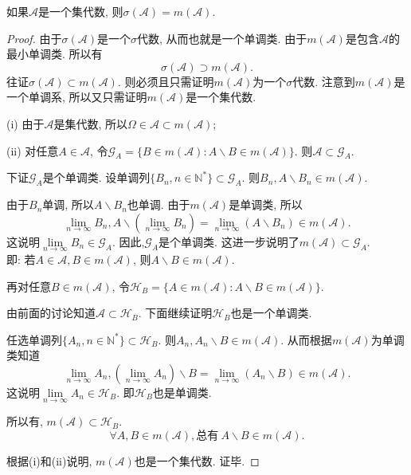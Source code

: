 \begin{theorem}
	如果$\mathscr{A}$是一个集代数, 则$\sigma(\mathscr{A})=m(\mathscr{A})$.
\end{theorem}
\begin{proof}
	由于$\sigma(\mathscr{A})$是一个$\sigma$代数,
	从而也就是一个单调类. 由于$m(\mathscr{A})$是包含$\mathscr{A}$的最小单调类. 所以有
	\begin{equation}
	\sigma(\mathscr{A})\supset m(\mathscr{A}).
	\end{equation}
	往证$\sigma(\mathscr{A})\subset m(\mathscr{A})$. 则必须且只需证明$m(\mathscr{A})$为一个$\sigma$代数. 注意到$m(\mathscr{A})$是一个单调系, 所以又只需证明$m(\mathscr{A})$是一个集代数.
	
	\begin{blist}
		\item[(i)] 由于$\mathscr{A}$是集代数, 所以$\Omega\in\mathscr{A}\subset m(\mathscr{A})$;
		\item[(ii)] 对任意$A\in\mathscr{A}$, 令$\mathscr{G}_{A} = \{ B\in m(\mathscr{A}): A\backslash B\in m(\mathscr{A}) \}$. 则$\mathscr{A}\subset \mathscr{G}_{A}$.
		
		下证$\mathscr{G}_{A}$是个单调类. 设单调列$\{B_n,n\in\mathbb{N}^*\}\subset \mathscr{G}_A$. 则$B_n,A\backslash B_n\in m(\mathscr{A})$.
		
		由于$B_n$单调, 所以$A\backslash B_n$也单调. 由于$m(\mathscr{A})$是单调类, 所以
		\begin{equation}
		\lim_{n\to\infty}B_n,A\backslash\left(\lim_{n\to\infty}B_n\right) = \lim_{n\to\infty}(A\backslash B_n) \in m(\mathscr{A}).
		\end{equation}
		这说明$\lim\limits_{n\to\infty}B_n\in\mathscr{G}_A$. 因此,$\mathscr{G}_{A}$是个单调类. 这进一步说明了$m(\mathscr{A})\subset \mathscr{G}_A$.\\
		即: 若$A\in\mathscr{A},B\in m(\mathscr{A})$, 则$A\backslash B\in m(\mathscr{A})$.
		
		再对任意$B\in m(\mathscr{A})$, 令$\mathscr{H}_{B} = \{ A\in m(\mathscr{A}):A\backslash B\in m(\mathscr{A}) \}$.
		
		由前面的讨论知道$\mathscr{A}\subset \mathscr{H}_B$. 下面继续证明$\mathscr{H}_B$也是一个单调类.
		
		任选单调列$\{A_n,n\in\mathbb{N}^*\}\subset \mathscr{H}_B$. 则$A_n,A_n\backslash B\in m(\mathscr{A})$. 从而根据$m(\mathscr{A})$为单调类知道
		\begin{equation}
		\lim_{n\to\infty}A_n,\left(\lim_{n\to\infty}A_n\right)\backslash B = \lim_{n\to\infty}(A_n\backslash B)\in m(\mathscr{A}).
		\end{equation}
		这说明$\lim\limits_{n\to\infty}A_n\in \mathscr{H}_B$. 即$\mathscr{H}_B$也是单调类.
		
		所以有, $m(\mathscr{A})\subset \mathscr{H}_B$. 
		\begin{equation}
		\forall A,B\in m(\mathscr{A}), \text{总有}~A\backslash B\in m(\mathscr{A}).
		\end{equation}
	\end{blist}
	根据(i)和(ii)说明, $m(\mathscr{A})$也是一个集代数. 证毕.
\end{proof}

